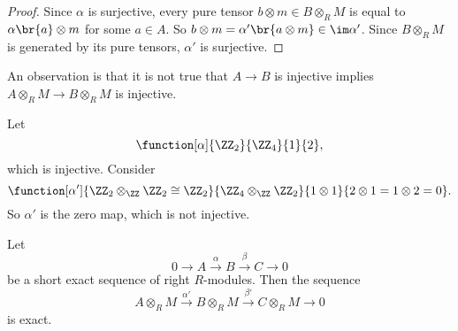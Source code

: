 \begin{proof}
Since $ \alpha $ is surjective, every pure tensor $ b \otimes m \in B \otimes_R M $ is equal to $ \alpha\br{a} \otimes m $ for some $ a \in A $. So $ b \otimes m = \alpha'\br{a \otimes m} \in \im \alpha' $. Since $ B \otimes_R M $ is generated by its pure tensors, $ \alpha' $ is surjective.
\end{proof}

An observation is that it is not true that $ A \to B $ is injective implies $ A \otimes_R M \to B \otimes_R M $ is injective.

\begin{example*}
Let
$$ \function[\alpha]{\ZZ_2}{\ZZ_4}{1}{2}, $$
which is injective. Consider
$$ \function[\alpha']{\ZZ_2 \otimes_\ZZ \ZZ_2 \cong \ZZ_2}{\ZZ_4 \otimes_\ZZ \ZZ_2}{1 \otimes 1}{2 \otimes 1 = 1 \otimes 2 = 0}. $$
So $ \alpha' $ is the zero map, which is not injective.
\end{example*}

\begin{proposition}
Let
$$ 0 \to A \xrightarrow{\alpha} B \xrightarrow{\beta} C \to 0 $$
be a short exact sequence of right $ R $-modules. Then the sequence
$$ A \otimes_R M \xrightarrow{\alpha'} B \otimes_R M \xrightarrow{\beta'} C \otimes_R M \to 0 $$
is exact.
\end{proposition}

